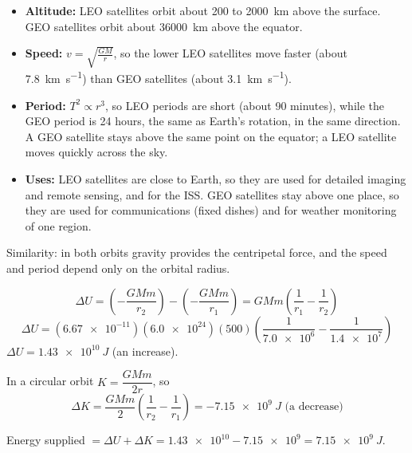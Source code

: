 \documentclass[12pt]{article}
\begin{document}
\ansq
\begin{crit}
\end{crit}
\sample
\begin{itemize}
  \item \textbf{Altitude:} LEO satellites orbit about 200 to \qty{2000}{km} above the surface. GEO
        satellites orbit about \qty{36000}{km} above the equator.
  \item \textbf{Speed:} $v = \sqrt{\frac{GM}{r}}$, so the lower LEO satellites move faster (about
        \qty{7.8}{km.s^{-1}}) than GEO satellites (about \qty{3.1}{km.s^{-1}}).
  \item \textbf{Period:} $T^2 \propto r^3$, so LEO periods are short (about 90 minutes), while the
        GEO period is 24 hours, the same as Earth's rotation, in the same direction. A GEO satellite
        stays above the same point on the equator; a LEO satellite moves quickly across the sky.
  \item \textbf{Uses:} LEO satellites are close to Earth, so they are used for detailed imaging and
        remote sensing, and for the ISS. GEO satellites stay above one place, so they are used for
        communications (fixed dishes) and for weather monitoring of one region.
\end{itemize}
Similarity: in both orbits gravity provides the centripetal force, and the speed and period depend
only on the orbital radius.

\ansq
{}
\begin{crit}
\end{crit}
\sample
\[ \Delta U = \left(-\frac{GMm}{r_2}\right) - \left(-\frac{GMm}{r_1}\right)
   = GMm\left(\frac{1}{r_1} - \frac{1}{r_2}\right) \]
\[ \Delta U = (\num{6.67e-11})(\num{6.0e24})(500)\left(\frac{1}{\num{7.0e6}} - \frac{1}{\num{1.4e7}}\right) \]
$\Delta U = \qty[retain-explicit-plus]{+1.43e10}{J}$ (an increase).
\begin{crit}
\end{crit}
\sample
In a circular orbit $K = \dfrac{GMm}{2r}$, so
\[ \Delta K = \frac{GMm}{2}\left(\frac{1}{r_2} - \frac{1}{r_1}\right) = \qty{-7.15e9}{J} \text{ (a decrease)} \]
\begin{crit}
\end{crit}
\sample
Energy supplied $= \Delta U + \Delta K = \num{1.43e10} - \num{7.15e9} = \qty{7.15e9}{J}$.
\end{document}
